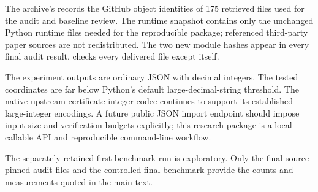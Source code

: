 \documentclass[11pt]{article}
\theoremstyle{definition}
\theoremstyle{remark}
\begin{document}
The archive's  records the GitHub object
identities of 175 retrieved files used for the audit and baseline review.
The runtime snapshot contains only the unchanged Python runtime files needed
for the reproducible package; referenced third-party paper sources are not
redistributed. The two new module hashes appear in every final audit result.
 checks every delivered file except itself.

The experiment outputs are ordinary JSON with decimal integers. The tested
coordinates are far below Python's default large-decimal-string threshold.
The native upstream certificate integer codec continues to support its
established large-integer encodings. A future public JSON import endpoint
should impose input-size and verification budgets explicitly; this research
package is a local callable API and reproducible command-line workflow.

The separately retained first benchmark run is exploratory. Only the final
source-pinned audit files and the controlled final benchmark provide the
counts and measurements quoted in the main text.
\end{document}
